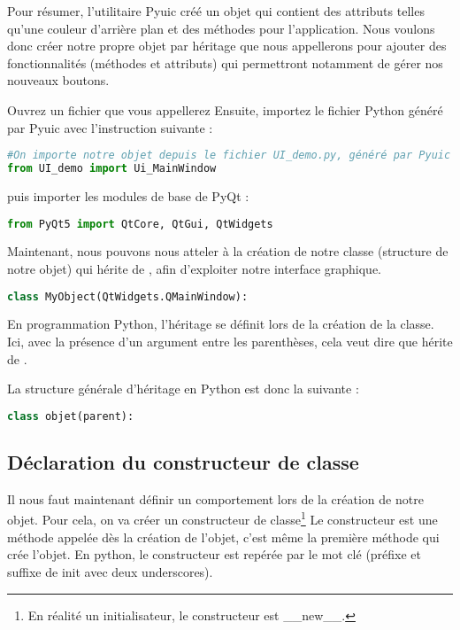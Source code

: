 Pour résumer, l'utilitaire Pyuic créé un objet  qui contient des attributs telles qu'une couleur d'arrière plan et des méthodes pour l'application. \newline
Nous voulons donc créer notre propre objet par héritage que nous appellerons  pour ajouter des fonctionnalités (méthodes et attributs) qui permettront notamment de gérer nos nouveaux boutons. \newline

Ouvrez un fichier que vous appellerez 
Ensuite, importez le fichier Python généré par Pyuic avec l'instruction suivante :

\begin{lstlisting}[language=Python]
#On importe notre objet depuis le fichier UI_demo.py, généré par Pyuic
from UI_demo import Ui_MainWindow
\end{lstlisting}

puis importer les modules de base de PyQt :  
\begin{lstlisting}[language=Python]
from PyQt5 import QtCore, QtGui, QtWidgets
\end{lstlisting}

Maintenant, nous pouvons nous atteler à la création de notre classe  (structure de notre objet) qui hérite de , afin d'exploiter notre interface graphique.


\begin{lstlisting}[language=Python]
class MyObject(QtWidgets.QMainWindow):
\end{lstlisting}

En programmation Python, l'héritage se définit lors de la création de la classe.\newline
Ici, avec la présence d'un argument entre les parenthèses, cela veut dire que  hérite de .

La structure générale d'héritage en Python est donc la suivante : 
\begin{lstlisting}[language=Python]
class objet(parent):
\end{lstlisting}

\subsection{Déclaration du constructeur de classe}

Il nous faut maintenant définir un comportement lors de la création de notre objet. \newline
Pour cela, on va créer un constructeur de classe\footnote{En réalité un initialisateur, le constructeur est \_\_new\_\_.}
Le constructeur est une méthode appelée dès la création de l'objet, c'est même la première méthode qui crée l'objet. \newline
En python, le constructeur est repérée par le mot clé  (préfixe et suffixe de init avec deux underscores).

